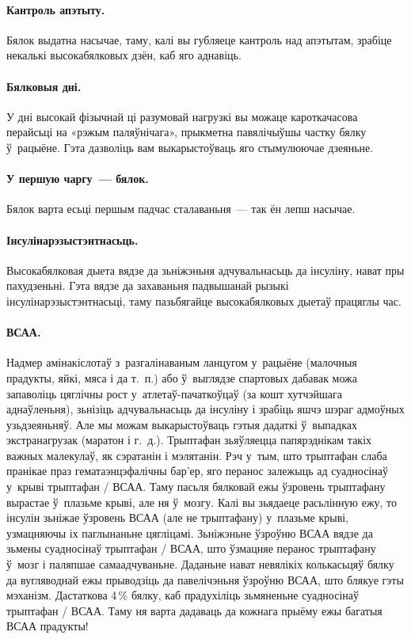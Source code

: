 \paragraph{Кантроль апэтыту.}
Бялок выдатна насычае, таму, калі вы губляеце кантроль над апэтытам, зрабіце некалькі высокабялковых дзён, каб яго аднавіць.

\paragraph{Бялковыя дні.}
У дні высокай фізычнай ці разумовай нагрузкі вы можаце кароткачасова перайсьці на «рэжым паляўнічага», прыкметна павялічыўшы частку бялку ў~рацыёне. Гэта дазволіць вам выкарыстоўваць яго стымулюючае дзеяньне.

\paragraph{У першую чаргу~--- бялок.}
Бялок варта есьці першым падчас сталаваньня~--- так ён лепш насычае.

\paragraph{Інсулінарэзыстэнтнасьць.}
Высокабялковая дыета вядзе да зьніжэньня адчувальнасьць да інсуліну, нават пры пахудзеньні. Гэта вядзе да захаваньня падвышанай рызыкі інсулінарэзыстэнтнасьці, таму пазьбягайце высокабялковых дыетаў працяглы час.

\paragraph{ВСАА.}
Надмер амінакіслотаў з~разгалінаваным ланцугом у~рацыёне (малочныя прадукты, яйкі, мяса і да т.~п.) або ў~выглядзе спартовых дабавак можа запаволіць цяглічны рост у~атлетаў-пачаткоўцаў (за кошт хутчэйшага аднаўленьня), зьнізіць адчувальнасьць да інсуліну і зрабіць яшчэ шэраг адмоўных узьдзеяньняў. Але мы можам выкарыстоўваць гэтыя дадаткі ў~выпадках экстранагрузак (маратон і г.~д.). Трыптафан зьяўляецца папярэднікам такіх важных малекулаў, як сэратанін і мэлятанін. Рэч у~тым, што трыптафан слаба пранікае праз гематаэнцэфалічны бар'ер, яго перанос залежыць ад суадносінаў у~крыві трыптафан / ВСАА. Таму пасьля бялковай ежы ўзровень трыптафану вырастае ў~плазьме крыві, але ня ў~мозгу. Калі вы зьядаеце расьлінную ежу, то інсулін зьніжае ўзровень ВСАА (але не трыптафану) у~плазьме крыві, узмацняючы іх паглынаньне цягліцамі. Зьніжэньне ўзроўню ВСАА вядзе да зьмены суадносінаў трыптафан / ВСАА, што ўзмацняе перанос трыптафану ў~мозг і паляпшае самаадчуваньне. Даданьне нават невялікіх колькасьцяў бялку да вугляводнай ежы прыводзіць да павелічэньня ўзроўню ВСАА, што блякуе гэты мэханізм. Дастаткова 4\,\% бялку, каб прадухіліць зьмяненьне суадносінаў трыптафан / ВСАА. Таму ня варта дадаваць да кожнага прыёму ежы багатыя ВСАА прадукты!

